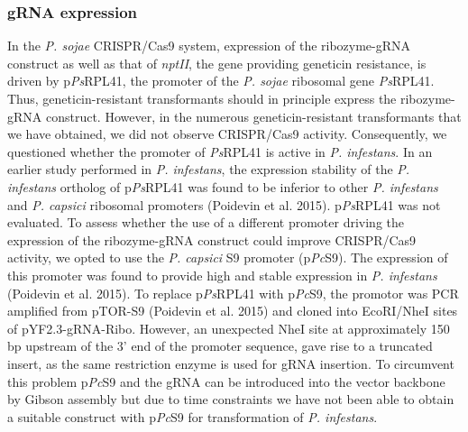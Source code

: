 \documentclass[onecolumn, 11pt,openany]{memoir}
\begin{document}
\begin{multicols}{2}
\subsubsection{gRNA expression}
In the \textit{P. sojae }CRISPR/Cas9 system, expression of the ribozyme-gRNA construct as well as that of \textit{nptII}, the gene providing geneticin resistance, is driven by p\textit{Ps}RPL41, the promoter of the \textit{P. sojae }ribosomal gene \textit{Ps}RPL41. Thus, geneticin-resistant transformants should in principle express the ribozyme-gRNA construct. However, in the numerous geneticin-resistant transformants that we have obtained, we did not observe CRISPR/Cas9 activity. Consequently, we questioned whether the promoter of \textit{Ps}RPL41 is active in \textit{P. infestans}. In an earlier study performed in \textit{P. infestans}, the expression stability of the \textit{P. infestans }ortholog of p\textit{Ps}RPL41 was found to be inferior to other \textit{P. infestans} and \textit{P. capsici }ribosomal promoters (Poidevin et al. 2015). p\textit{Ps}RPL41 was not evaluated. To assess whether the use of a different promoter driving the expression of the ribozyme-gRNA construct could improve CRISPR/Cas9 activity, we opted to use the \textit{P. capsici} S9 promoter (p\textit{Pc}S9). The expression of this promoter was found to provide high and stable expression in \textit{P. infestans }(Poidevin et al. 2015). To replace p\textit{Ps}RPL41 with p\textit{Pc}S9, the promotor was PCR amplified from pTOR-S9 (Poidevin et al. 2015) and cloned into EcoRI/NheI sites of pYF2.3-gRNA-Ribo. However, an unexpected NheI site at approximately 150 bp upstream of the 3’ end of the promoter sequence, gave rise to a truncated insert, as the same restriction enzyme is used for gRNA insertion. To circumvent this problem p\textit{Pc}S9 and the gRNA can be introduced into the vector backbone by Gibson assembly but due to time constraints we have not been able to obtain a suitable construct with p\textit{Pc}S9 for transformation of\textit{ P. infestans}.


\end{multicols}
\end{document}
